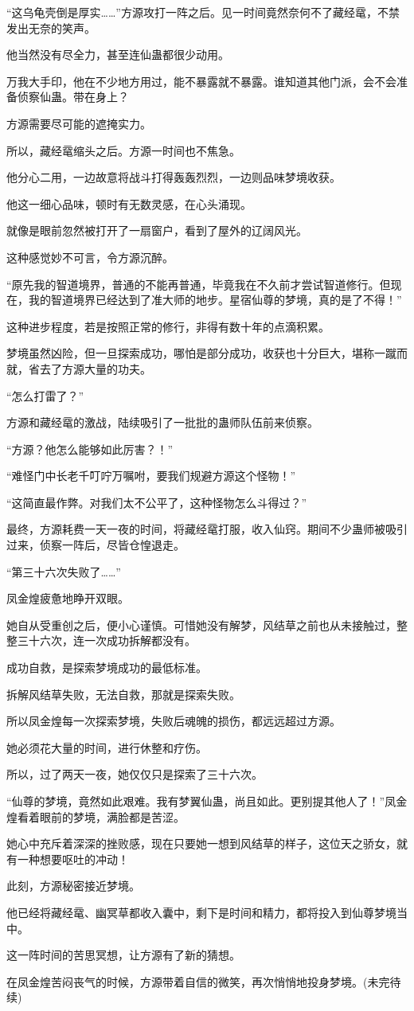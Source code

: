 \begin{this_body}
“这乌龟壳倒是厚实……”方源攻打一阵之后。见一时间竟然奈何不了藏经鼋，不禁发出无奈的笑声。

他当然没有尽全力，甚至连仙蛊都很少动用。

万我大手印，他在不少地方用过，能不暴露就不暴露。谁知道其他门派，会不会准备侦察仙蛊。带在身上？

方源需要尽可能的遮掩实力。

所以，藏经鼋缩头之后。方源一时间也不焦急。

他分心二用，一边故意将战斗打得轰轰烈烈，一边则品味梦境收获。

他这一细心品味，顿时有无数灵感，在心头涌现。

就像是眼前忽然被打开了一扇窗户，看到了屋外的辽阔风光。

这种感觉妙不可言，令方源沉醉。

“原先我的智道境界，普通的不能再普通，毕竟我在不久前才尝试智道修行。但现在，我的智道境界已经达到了准大师的地步。星宿仙尊的梦境，真的是了不得！”

这种进步程度，若是按照正常的修行，非得有数十年的点滴积累。

梦境虽然凶险，但一旦探索成功，哪怕是部分成功，收获也十分巨大，堪称一蹴而就，省去了方源大量的功夫。

“怎么打雷了？”

方源和藏经鼋的激战，陆续吸引了一批批的蛊师队伍前来侦察。

“方源？他怎么能够如此厉害？！”

“难怪门中长老千叮咛万嘱咐，要我们规避方源这个怪物！”

“这简直最作弊。对我们太不公平了，这种怪物怎么斗得过？”

最终，方源耗费一天一夜的时间，将藏经鼋打服，收入仙窍。期间不少蛊师被吸引过来，侦察一阵后，尽皆仓惶退走。

“第三十六次失败了……”

凤金煌疲惫地睁开双眼。

她自从受重创之后，便小心谨慎。可惜她没有解梦，风结草之前也从未接触过，整整三十六次，连一次成功拆解都没有。

成功自救，是探索梦境成功的最低标准。

拆解风结草失败，无法自救，那就是探索失败。

所以凤金煌每一次探索梦境，失败后魂魄的损伤，都远远超过方源。

她必须花大量的时间，进行休整和疗伤。

所以，过了两天一夜，她仅仅只是探索了三十六次。

“仙尊的梦境，竟然如此艰难。我有梦翼仙蛊，尚且如此。更别提其他人了！”凤金煌看着眼前的梦境，满脸都是苦涩。

她心中充斥着深深的挫败感，现在只要她一想到风结草的样子，这位天之骄女，就有一种想要呕吐的冲动！

此刻，方源秘密接近梦境。

他已经将藏经鼋、幽冥草都收入囊中，剩下是时间和精力，都将投入到仙尊梦境当中。

这一阵时间的苦思冥想，让方源有了新的猜想。

在凤金煌苦闷丧气的时候，方源带着自信的微笑，再次悄悄地投身梦境。(未完待续)

\end{this_body}

